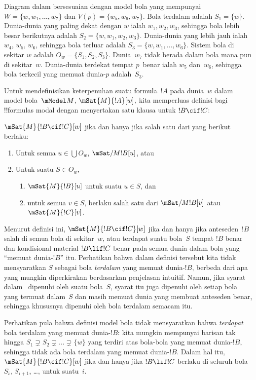 \documentclass[../../../include/open-logic-section]{subfiles}
\begin{document}
Diagram dalam  bersesuaian dengan model bola yang
mempunyai $W = \{w, w_1, \dots, w_7\}$ dan $V(p) = \{w_5, w_6,
w_7\}$. Bola terdalam adalah $S_1 = \{w\}$. Dunia-dunia yang paling dekat
dengan $w$ ialah $w_1, w_2, w_3$, sehingga bola lebih besar berikutnya
adalah $S_2 = \{w, w_1, w_2, w_3\}$. Dunia-dunia yang lebih jauh ialah
$w_4$, $w_5$, $w_6$, sehingga bola terluar adalah $S_3 = \{w, w_1,
\dots, w_6\}$. Sistem bola di sekitar $w$ adalah $O_w = \{S_1, S_2,
S_3\}$. Dunia~$w_7$ tidak berada dalam bola mana pun di sekitar~$w$.
Dunia-dunia terdekat tempat $p$~benar ialah $w_5$ dan~$w_6$, sehingga bola
terkecil yang memuat dunia-$p$ adalah~$S_3$.

Untuk mendefinisikan keterpenuhan suatu formula~$!A$ pada dunia~$w$ dalam
model bola~$\mModel M$, $\mSat{M}{!A}[w]$, kita memperluas definisi bagi
!!{formula}s modal dengan menyertakan satu klausa untuk $!B \cif !C$:

\begin{defn}
  $\mSat{M}{!B \cif !C}[w]$ jika dan hanya jika salah satu dari yang berikut
  berlaku:
  \begin{enumerate}
  \item{} Untuk semua $u \in \bigcup O_w$,
    $\mSat/{M}{!B}[u]$, atau
  \item{} Untuk suatu $S \in O_w$,
    \begin{enumerate}
      \item $\mSat{M}{!B}[u]$ untuk suatu $u \in S$, dan
      \item untuk semua $v \in S$, berlaku salah satu dari
        $\mSat/{M}{!B}[v]$ atau $\mSat{M}{!C}[v]$.
    \end{enumerate}
  \end{enumerate}
\end{defn}

Menurut definisi ini, $\mSat{M}{!B \cif !C}[w]$ jika dan hanya jika
anteseden~$!B$ salah di semua bola di sekitar~$w$, atau terdapat suatu
bola~$S$ tempat $!B$ benar dan kondisional material $!B \lif !C$ benar pada
semua dunia dalam bola yang ``memuat dunia-$!B$'' itu. Perhatikan bahwa
dalam definisi tersebut kita tidak mensyaratkan $S$ sebagai bola
\emph{terdalam} yang memuat dunia-$!B$, berbeda dari apa yang mungkin
diperkirakan berdasarkan penjelasan intuitif. Namun, jika syarat
dalam~ dipenuhi oleh suatu bola~$S$, syarat itu juga
dipenuhi oleh setiap bola yang termuat dalam~$S$ dan masih memuat dunia yang
membuat anteseden benar, sehingga khususnya dipenuhi oleh bola terdalam
semacam itu.

Perhatikan pula bahwa definisi model bola tidak mensyaratkan bahwa
\emph{terdapat} bola
terdalam yang memuat dunia-$!B$: kita mungkin mempunyai barisan tak hingga
$S_1 \supsetneq S_2 \supsetneq \dots \supsetneq \{w\}$ yang terdiri atas
bola-bola yang memuat dunia-$!B$, sehingga tidak ada bola terdalam yang
memuat dunia-$!B$. Dalam hal itu, $\mSat{M}{!B \cif !C}[w]$ jika dan hanya
jika $!B \lif !C$ berlaku di seluruh bola $S_i$, $S_{i+1}$, \dots, untuk
suatu~$i$.
\end{document}
